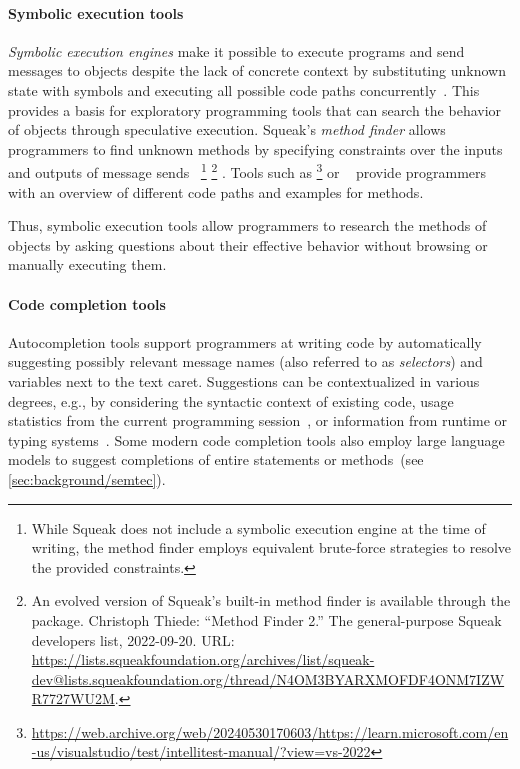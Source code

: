 	\paragraph{Symbolic execution tools}
	\label{par:background/expsys/tools/symbex}
	\emph{Symbolic execution engines} make it possible to execute programs and send messages to objects despite the lack of concrete context by substituting unknown state with symbols and executing all possible code paths concurrently~\cite{cadar2013symbolic,thiede2023symbolic}.
	This provides a basis for exploratory programming tools that can search the behavior of objects through speculative execution.
	Squeak's \emph{method finder} allows programmers to find unknown methods by specifying constraints over the inputs and outputs of message sends~\cite[sec.~1.8]{thiede2023squeak}%
	\footnote{While Squeak does not include a symbolic execution engine at the time of writing, the method finder employs equivalent brute-force strategies to resolve the provided constraints.}%
	\footnote{
		An evolved version of Squeak's built-in method finder is available through the  package.
		Christoph Thiede: ``Method Finder 2.'' The general-purpose Squeak developers list, 2022-09-20. URL: \url{https://lists.squeakfoundation.org/archives/list/squeak-dev@lists.squeakfoundation.org/thread/N4OM3BYARXMOFDF4ONM7IZWR7727WU2M}.
	}%
	.
	Tools such as \footnote{
		\url{https://web.archive.org/web/20240530170603/https://learn.microsoft.com/en-us/visualstudio/test/intellitest-manual/?view=vs-2022}
	} or ~\cite{hentschel2019symbolic} provide programmers with an overview of different code paths and examples for methods.

	Thus, symbolic execution tools allow programmers to research the methods of objects by asking questions about their effective behavior without browsing or manually executing them.

	\paragraph{Code completion tools}
	\label{par:background/expsys/tools/completion}
	Autocompletion tools support programmers at writing code by automatically suggesting possibly relevant message names (also referred to as \emph{selectors}) and variables next to the text caret.
	Suggestions can be contextualized in various degrees, e.g., by considering the syntactic context of existing code, usage statistics from the current programming session~\cite{robbes2008program}, or information from runtime or typing systems~\cite{pluquet2009fast}.
	Some modern code completion tools also employ large language models to suggest completions of entire statements or methods~(see \cref{sec:background/semtec}).

